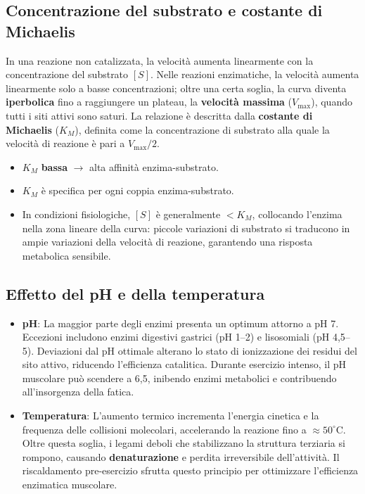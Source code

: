 \documentclass[12pt,a4paper]{report}
\begin{document}
\subsection{Concentrazione del substrato e costante di Michaelis}
In una reazione non catalizzata, la velocità aumenta linearmente con la concentrazione del substrato \([S]\). Nelle reazioni enzimatiche, la velocità aumenta linearmente solo a basse concentrazioni; oltre una certa soglia, la curva diventa \textbf{iperbolica} fino a raggiungere un plateau, la \textbf{velocità massima} (\(V_{\max}\)), quando tutti i siti attivi sono saturi.
La relazione è descritta dalla \textbf{costante di Michaelis} (\(K_M\)), definita come la concentrazione di substrato alla quale la velocità di reazione è pari a \(V_{\max}/2\).
\begin{itemize}
\item \(K_M\) \textbf{bassa} \(\rightarrow\) alta affinità enzima-substrato.
\item \(K_M\) è specifica per ogni coppia enzima-substrato.
\item In condizioni fisiologiche, \([S]\) è generalmente \(< K_M\), collocando l'enzima nella zona lineare della curva: piccole variazioni di substrato si traducono in ampie variazioni della velocità di reazione, garantendo una risposta metabolica sensibile.
\end{itemize}
\subsection{Effetto del pH e della temperatura}
\begin{itemize}
\item \textbf{pH}: La maggior parte degli enzimi presenta un optimum attorno a pH 7. Eccezioni includono enzimi digestivi gastrici (pH 1--2) e lisosomiali (pH 4,5--5). Deviazioni dal pH ottimale alterano lo stato di ionizzazione dei residui del sito attivo, riducendo l'efficienza catalitica. Durante esercizio intenso, il pH muscolare può scendere a 6,5, inibendo enzimi metabolici e contribuendo all'insorgenza della fatica.
\item \textbf{Temperatura}: L'aumento termico incrementa l'energia cinetica e la frequenza delle collisioni molecolari, accelerando la reazione fino a \(\approx 50^\circ\mathrm{C}\). Oltre questa soglia, i legami deboli che stabilizzano la struttura terziaria si rompono, causando \textbf{denaturazione} e perdita irreversibile dell'attività. Il riscaldamento pre-esercizio sfrutta questo principio per ottimizzare l'efficienza enzimatica muscolare.
\end{itemize}
\end{document}
